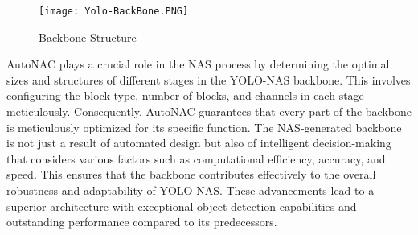 \begin{enumerate}
\begin{figure}[H]
    \centering
    \texttt{[image: Yolo-BackBone.PNG]}
    \caption{Backbone Structure}
    \label{fig:BackBone}
\end{figure}

AutoNAC plays a crucial role in the NAS process by determining the optimal sizes and structures of different stages in the YOLO-NAS backbone. This involves configuring the block type, number of blocks, and channels in each stage meticulously. Consequently, AutoNAC guarantees that every part of the backbone is meticulously optimized for its specific function. The NAS-generated backbone is not just a result of automated design but also of intelligent decision-making that considers various factors such as computational efficiency, accuracy, and speed. This ensures that the backbone contributes effectively to the overall robustness and adaptability of YOLO-NAS. These advancements lead to a superior architecture with exceptional object detection capabilities and outstanding performance compared to its predecessors.
\end{enumerate} 

